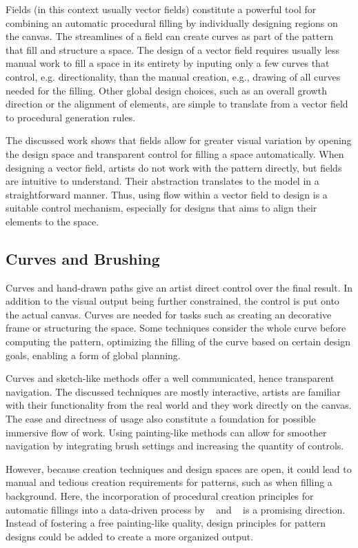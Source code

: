 Fields (in this context usually vector fields) constitute a powerful tool for combining an automatic procedural filling by individually designing regions on the canvas. The streamlines of a field can create curves as part of the pattern that fill and structure a space. The design of a vector field requires usually less manual work to fill a space in its entirety by inputing only a few curves that control, e.g. directionality, than the manual creation, e.g., drawing of all curves needed for the filling. Other global design choices, such as an overall growth direction or the alignment of elements, are simple to translate from a vector field to procedural generation rules.

The discussed work shows that fields allow for greater visual variation by opening the design space and transparent control for filling a space automatically. When designing a vector field, artists do not work with the pattern directly, but fields are intuitive to understand. Their abstraction translates to the model in a straightforward manner. Thus, using flow within a vector field to design is a suitable control mechanism, especially for designs that aims to align their elements to the space.

\subsection{Curves and Brushing}
\label{subsubsec:analysis_creative_means_curves}

Curves and hand-drawn paths give an artist direct control over the final result. In addition to the visual output being further constrained, the control is put onto the actual canvas. Curves are needed for tasks such as creating an decorative frame or structuring the space. Some techniques consider the whole curve before computing the pattern, optimizing the filling of the curve based on certain design goals, enabling a form of global planning.

Curves and sketch-like methods offer a well communicated, hence transparent navigation. The discussed techniques are mostly interactive, artists are familiar with their functionality from the real world and they work directly on the canvas. The ease and directness of usage also constitute a foundation for possible immersive flow of work. Using painting-like methods can allow for smoother navigation by integrating brush settings and increasing the quantity of controls.

However, because creation techniques and design spaces are open, it could lead to manual and tedious creation requirements for patterns, such as when filling a background. Here, the incorporation of procedural creation principles for automatic fillings into a data-driven process by \citeauthor*{kazi_2012_vit}~\cite{kazi_2012_vit} and \citeauthor*{xing_2014_apr}~\cite{xing_2014_apr} is a promising direction. Instead of fostering a free painting-like quality, design principles for pattern designs could be added to create a more organized output.


